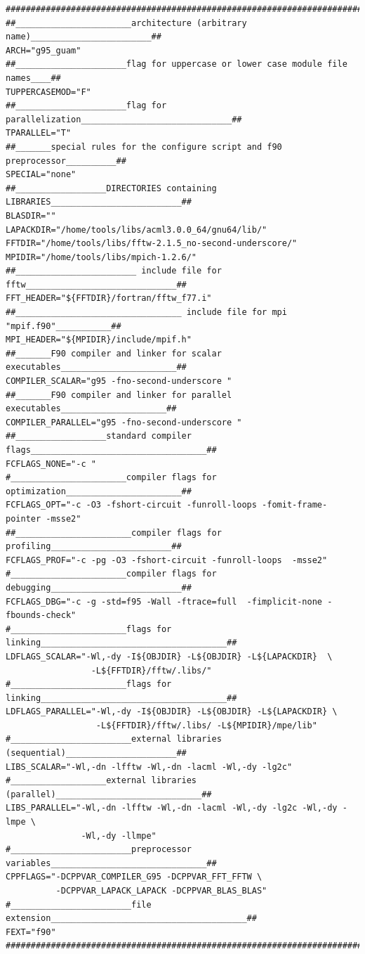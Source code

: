 \documentclass[a4paper,10pt]{report}
\begin{document}
\begin{verbatim}
################################################################################
##_______________________architecture (arbitrary name)________________________##
ARCH="g95_guam"
##______________________flag for uppercase or lower case module file names____##
TUPPERCASEMOD="F"
##______________________flag for parallelization______________________________##
TPARALLEL="T"
##_______special rules for the configure script and f90 preprocessor__________##
SPECIAL="none"
##__________________DIRECTORIES containing LIBRARIES__________________________##
BLASDIR=""
LAPACKDIR="/home/tools/libs/acml3.0.0_64/gnu64/lib/"
FFTDIR="/home/tools/libs/fftw-2.1.5_no-second-underscore/"
MPIDIR="/home/tools/libs/mpich-1.2.6/"
##________________________ include file for fftw______________________________##
FFT_HEADER="${FFTDIR}/fortran/fftw_f77.i"
##_________________________________ include file for mpi "mpif.f90"___________##
MPI_HEADER="${MPIDIR}/include/mpif.h"
##_______F90 compiler and linker for scalar executables_______________________##
COMPILER_SCALAR="g95 -fno-second-underscore "
##_______F90 compiler and linker for parallel executables_____________________##
COMPILER_PARALLEL="g95 -fno-second-underscore "
##__________________standard compiler flags___________________________________##
FCFLAGS_NONE="-c "
#_______________________compiler flags for optimization_______________________##
FCFLAGS_OPT="-c -O3 -fshort-circuit -funroll-loops -fomit-frame-pointer -msse2"
##_______________________compiler flags for  profiling________________________##
FCFLAGS_PROF="-c -pg -O3 -fshort-circuit -funroll-loops  -msse2"
#_______________________compiler flags for debugging__________________________##
FCFLAGS_DBG="-c -g -std=f95 -Wall -ftrace=full  -fimplicit-none -fbounds-check"
#_______________________flags for linking_____________________________________##
LDFLAGS_SCALAR="-Wl,-dy -I${OBJDIR} -L${OBJDIR} -L${LAPACKDIR}  \
                 -L${FFTDIR}/fftw/.libs/"
#_______________________flags for linking_____________________________________##
LDFLAGS_PARALLEL="-Wl,-dy -I${OBJDIR} -L${OBJDIR} -L${LAPACKDIR} \
                  -L${FFTDIR}/fftw/.libs/ -L${MPIDIR}/mpe/lib"
#________________________external libraries (sequential)______________________##
LIBS_SCALAR="-Wl,-dn -lfftw -Wl,-dn -lacml -Wl,-dy -lg2c"
#___________________external libraries (parallel)_____________________________## 
LIBS_PARALLEL="-Wl,-dn -lfftw -Wl,-dn -lacml -Wl,-dy -lg2c -Wl,-dy -lmpe \
               -Wl,-dy -llmpe"
#________________________preprocessor variables_______________________________## 
CPPFLAGS="-DCPPVAR_COMPILER_G95 -DCPPVAR_FFT_FFTW \
          -DCPPVAR_LAPACK_LAPACK -DCPPVAR_BLAS_BLAS"
#________________________file extension_______________________________________## 
FEXT="f90"
################################################################################
\end{verbatim}
\end{document}
